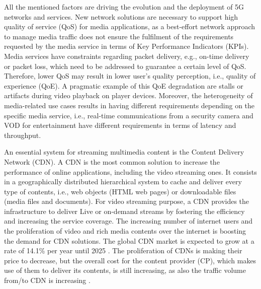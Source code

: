All the mentioned factors are driving the evolution and the deployment of 5G networks and services. New network solutions are necessary to support high quality of service (QoS) for media applications, as a best-effort network approach to manage media traffic does not ensure the fulfilment of the requirements requested by the media service in terms of Key Performance Indicators (KPIs). Media services have constraints regarding packet delivery, e.g., on-time delivery or packet loss, which need to be addressed to guarantee a certain level of QoS. Therefore, lower QoS may result in lower user's quality perception, i.e., quality of experience (QoE). A pragmatic example of this QoE degradation are stalls or artifacts during video playback on player devices. Moreover, the heterogeneity of media-related use cases results in having different requirements depending on the specific media service, i.e., real-time communications from a security camera and VOD for entertainment have different requirements in terms of latency and throughput.

An essential system for streaming multimedia content is the Content Delivery Network (CDN). A CDN is the most common solution to increase the performance of online applications, including the video streaming ones. It consists in a geographically distributed hierarchical system to cache and deliver every type of contents, i.e., web objects (HTML web pages) or downloadable files (media files and documents). For video streaming purpose, a CDN provides the infrastructure to deliver Live or on-demand streams by fostering the efficiency and increasing the service coverage. The increasing number of internet users and the proliferation of video and rich media contents over the internet is boosting the demand for CDN solutions. The global CDN market is expected to grow at a rate of 14.1\% per year until 2025 \cite{CDNMarkets}.
The proliferation of CDNs is making their price to decrease, but the overall cost for the content provider (CP), which makes use of them to deliver its contents, is still increasing, as also the traffic volume from/to CDN is increasing \cite{Rayburn2020}.


